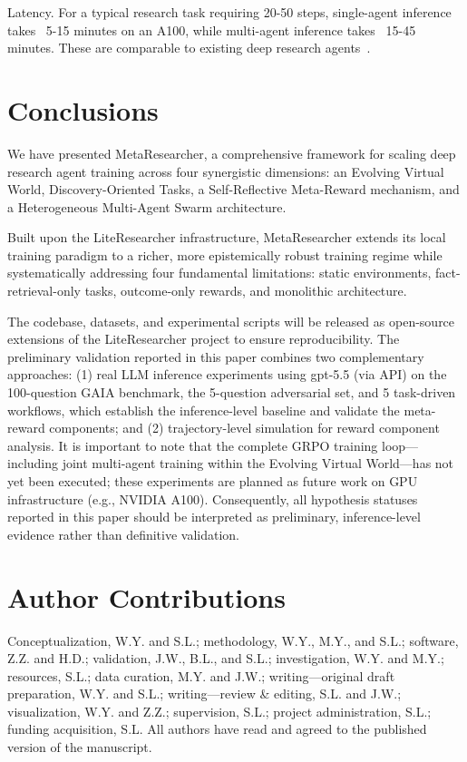\documentclass[notspecified,article,accept,pdftex,moreauthors]{Definitions/mdpi}
\renewcommand{\textbf}[1]{#1}
\begin{document}
\textbf{Latency.} For a typical research task requiring 20-50 steps, single-agent inference takes ~5-15 minutes on an A100, while multi-agent inference takes ~15-45 minutes. These are comparable to existing deep research agents~\cite{b1,b6}.
\section{Conclusions}
\label{sec:conclusion}
We have presented MetaResearcher, a comprehensive framework for scaling deep research agent training across four synergistic dimensions: an Evolving Virtual World, Discovery-Oriented Tasks, a Self-Reflective Meta-Reward mechanism, and a Heterogeneous Multi-Agent Swarm architecture.

Built upon the LiteResearcher infrastructure, MetaResearcher extends its local training paradigm to a richer, more epistemically robust training regime while systematically addressing four fundamental limitations: static environments, fact-retrieval-only tasks, outcome-only rewards, and monolithic architecture.

The codebase, datasets, and experimental scripts will be released as open-source extensions of the LiteResearcher project to ensure reproducibility. The preliminary validation reported in this paper combines two complementary approaches: (1) real LLM inference experiments using gpt-5.5 (via API) on the 100-question GAIA benchmark, the 5-question adversarial set, and 5 task-driven workflows, which establish the inference-level baseline and validate the meta-reward components; and (2) trajectory-level simulation for reward component analysis. It is important to note that the complete GRPO training loop---including joint multi-agent training within the Evolving Virtual World---has not yet been executed; these experiments are planned as future work on GPU infrastructure (e.g., NVIDIA A100). Consequently, all hypothesis statuses reported in this paper should be interpreted as preliminary, inference-level evidence rather than definitive validation.
\section*{Author Contributions}
Conceptualization, W.Y. and S.L.; methodology, W.Y., M.Y., and S.L.; software, Z.Z. and H.D.; validation, J.W., B.L., and S.L.; investigation, W.Y. and M.Y.; resources, S.L.; data curation, M.Y. and J.W.; writing---original draft preparation, W.Y. and S.L.; writing---review \& editing, S.L. and J.W.; visualization, W.Y. and Z.Z.; supervision, S.L.; project administration, S.L.; funding acquisition, S.L. All authors have read and agreed to the published version of the manuscript.
\end{document}
